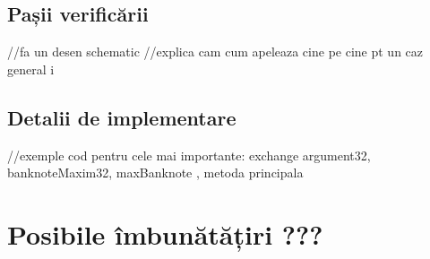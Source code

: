     \subsection{Pașii verificării}
    //fa un desen schematic
    //explica cam cum apeleaza cine pe cine pt un caz general i 

    \subsection{Detalii de implementare}
    //exemple cod pentru cele mai importante: exchange argument32, banknoteMaxim32, maxBanknote , metoda principala

\section{Posibile îmbunătățiri ???}


